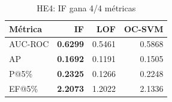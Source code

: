 \begin{table}[htbp]
\centering
\small
\caption{HE4: IF gana 4/4 métricas}
\label{tab:he4-comparison}
\begin{tabular}{lrrr}
\toprule
Métrica & IF & LOF & OC-SVM \\
\midrule
  AUC-ROC & \textbf{0.6299} & 0.5461 & 0.5868 \\
  AP & \textbf{0.1692} & 0.1191 & 0.1505 \\
  P@5\% & \textbf{0.2325} & 0.1266 & 0.2248 \\
  EF@5\% & \textbf{2.2073} & 1.2022 & 2.1336 \\
\bottomrule
\end{tabular}
\end{table}

